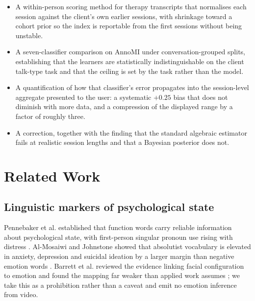 \documentclass[conference]{IEEEtran}
\begin{document}
\begin{itemize}
\item A within-person scoring method for therapy transcripts that normalises
each session against the client's own earlier sessions, with shrinkage toward
a cohort prior so the index is reportable from the first sessions without
being unstable.
\item A seven-classifier comparison on AnnoMI under conversation-grouped
splits, establishing that the learners are statistically indistinguishable on
the client talk-type task and that the ceiling is set by the task rather than
the model.
\item A quantification of how that classifier's error propagates into the
session-level aggregate presented to the user: a systematic $+0.25$ bias that
does not diminish with more data, and a compression of the displayed range by
a factor of roughly three.
\item A correction, together with the finding that the standard algebraic
estimator fails at realistic session lengths and that a Bayesian posterior
does not.
\end{itemize}

\section{Related Work}

\subsection{Linguistic markers of psychological state}
Pennebaker et al. established that function words carry reliable information
about psychological state, with first-person singular pronoun use rising with
distress \cite{pennebaker2003}. Al-Mosaiwi and Johnstone showed that
absolutist vocabulary is elevated in anxiety, depression and suicidal
ideation by a larger margin than negative emotion words \cite{almosaiwi2018}.
Barrett et al. reviewed the evidence linking facial configuration to emotion
and found the mapping far weaker than applied work assumes
\cite{barrett2019}; we take this as a prohibition rather than a caveat and
emit no emotion inference from video.
\end{document}
